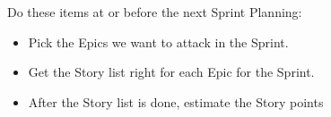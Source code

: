 \documentclass[letterpaper,11pt]{texMemo} %
\begin{document}
\noindent Do these items at or before the next Sprint Planning:

\begin{itemize}
[noitemsep]
\item Pick the Epics we want to attack in the Sprint.
\item Get the Story list right for each Epic for the Sprint.
\item After the Story list is done, estimate the Story points
\end{itemize}

\end{document}
